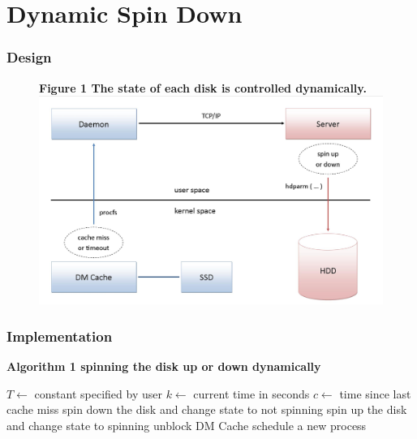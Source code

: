 \documentclass{beamer}
\begin{document}
\section{Dynamic Spin Down}
%
\begin{frame}
    \frametitle{Design}
    \begin{figure}
	\bf Figure 1 \rm The state of each disk is controlled dynamically.
	\centering \includegraphics[scale=.31]{drawing.jpg}
	\label{fig:struct}
    \end{figure}
\end{frame}
\begin{frame}
    \frametitle{Implementation}
    \bf Algorithm 1 \rm spinning the disk up or down dynamically \\
    \algrenewcommand{}
    \begin{algorithmic}[1]
	\State $T\gets$ constant specified by user
		\State $k\gets$ current time in seconds
		\State $c\gets$ time since last cache miss
		    \State spin down the disk and change state to not spinning
		\EndIf
	    \Else {}
		    \State spin up the disk and change state to spinning
		    \State unblock DM Cache
		\EndIf
	    \EndIf
	    \State schedule a new process
	\EndWhile
	\EndProcedure
    \end{algorithmic}
\end{frame}
%
\end{document}
